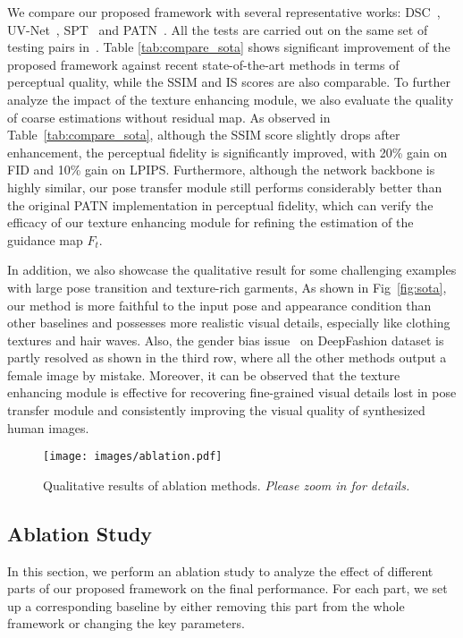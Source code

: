 \documentclass{article}
\begin{document}
 We compare our proposed framework with several representative works: DSC~\cite{DeformableGAN}, UV-Net~\cite{UVNet}, SPT~\cite{SPT} and PATN~\cite{PATN}. All the tests are carried out on the same set of testing pairs in~\cite{PATN}.
Table \ref{tab:compare_sota} shows significant improvement of the proposed framework against recent state-of-the-art methods in terms of perceptual quality, while the SSIM and IS scores are also comparable.
 To further analyze the impact of the texture enhancing module, we also evaluate the quality of coarse estimations without residual map. As observed in Table~\ref{tab:compare_sota}, although the SSIM score slightly drops after enhancement, the perceptual fidelity is significantly improved, with 20\% gain on FID and 10\% gain on LPIPS. Furthermore, although the network backbone is highly similar, our pose transfer module still performs considerably better than the original PATN implementation in perceptual fidelity, which can verify the efficacy of our texture enhancing module for refining the estimation of the guidance map $F_t$.

 In addition, we also showcase the qualitative result for some challenging examples with large pose transition and texture-rich garments, As shown in Fig~\ref{fig:sota}, our method is more faithful to the input pose and appearance condition than other baselines and possesses more realistic visual details, especially like clothing textures and hair waves. Also, the gender bias issue~\cite{DeformableGAN} on DeepFashion dataset is partly resolved as shown in the third row, where all the other methods output a female image by mistake. Moreover, it can be observed that the texture enhancing module is effective for recovering fine-grained visual details lost in pose transfer module and consistently improving the visual quality of synthesized human images.


\begin{figure}[t]
  \centering
  \texttt{[image: images/ablation.pdf]}
  \caption{Qualitative results of ablation methods. \emph{Please zoom in for details.}}\label{fig:ablation}
\end{figure}


\subsection{Ablation Study}
In this section, we perform an ablation study to analyze the effect of different parts of our proposed framework on the final performance. For each part, we set up a corresponding baseline by either removing this part from the whole framework or changing the key parameters.
\end{document}
